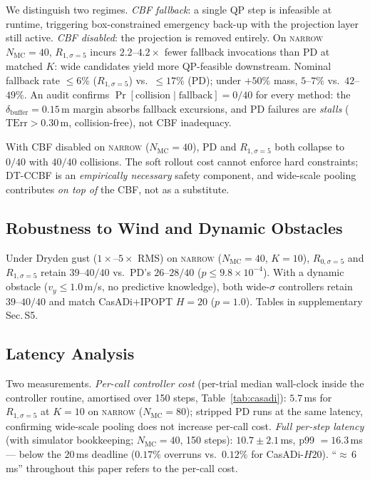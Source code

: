 \documentclass[11pt,onecolumn,a4paper]{article}
\newcommand{\Nm}{N_{\mathrm{MC}}}
\newcommand{\TErr}{\mathrm{TErr}}
\begin{document}
We distinguish two regimes. \emph{CBF fallback}: a single QP step
is infeasible at runtime, triggering box-constrained emergency back-up
with the projection layer still active. \emph{CBF disabled}: the
projection is removed entirely. On \textsc{narrow} $\Nm = 40$,
$R_{1,\sigma=5}$ incurs $2.2$--$4.2\times$ fewer fallback invocations
than PD at matched $K$: wide candidates yield more QP-feasible
downstream. Nominal fallback rate $\le 6\%$ ($R_{1,\sigma=5}$) vs.\
$\le 17\%$ (PD); under $+50\%$ mass, $5$--$7\%$ vs.\ $42$--$49\%$.
An audit confirms $\Pr[\text{collision}\mid\text{fallback}] = 0/40$
for every method: the $\delta_{\mathrm{buffer}} = 0.15\,$m margin
absorbs fallback excursions, and PD failures are \emph{stalls}
($\TErr > 0.30\,$m, collision-free), not CBF inadequacy.

With CBF disabled on \textsc{narrow} ($\Nm = 40$), PD and
$R_{1,\sigma=5}$ both collapse to $0/40$ with $40/40$ collisions.
The soft rollout cost cannot enforce hard constraints; DT-CCBF is
an \emph{empirically necessary} safety component, and wide-scale
pooling contributes \emph{on top of} the CBF, not as a substitute.

\subsection{Robustness to Wind and Dynamic Obstacles}\label{sec:exp-robust}

Under Dryden gust ($1\times$--$5\times$ RMS) on \textsc{narrow}
($\Nm = 40$, $K = 10$), $R_{0,\sigma=5}$ and $R_{1,\sigma=5}$ retain
$39$--$40/40$ vs.\ PD's $26$--$28/40$ ($p \le 9.8\times 10^{-4}$).
With a dynamic obstacle ($v_y \le 1.0\,$m/s, no predictive knowledge),
both wide-$\sigma$ controllers retain $39$--$40/40$ and match
CasADi+IPOPT $H = 20$ ($p = 1.0$). Tables in supplementary Sec.\,S5.

\subsection{Latency Analysis}\label{sec:exp-latency}

Two measurements. \emph{Per-call controller cost} (per-trial median
wall-clock inside the controller routine, amortised over 150 steps,
Table~\ref{tab:casadi}): $5.7\,$ms for $R_{1,\sigma=5}$ at $K = 10$
on \textsc{narrow} ($\Nm = 80$); stripped PD runs at the same latency,
confirming wide-scale pooling does not increase per-call cost.
\emph{Full per-step latency} (with simulator bookkeeping; $\Nm = 40$,
150 steps): $10.7 \pm 2.1\,$ms, p99 $= 16.3\,$ms --- below the
$20\,$ms deadline ($0.17\%$ overruns vs.\ $0.12\%$ for CasADi-$H20$).
``${\approx}\,6\,$ms'' throughout this paper refers to the per-call cost.
\end{document}
